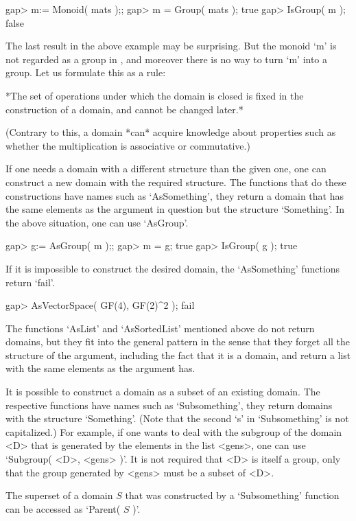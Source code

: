 \beginexample
gap> m:= Monoid( mats );;
gap> m = Group( mats );
true
gap> IsGroup( m );
false
\endexample

The last result in the above example may be surprising.
But the monoid `m' is not regarded as a group in {\GAP},
and moreover there is no way to turn `m' into a group.
Let us formulate this as a rule:

*The set of operations under which the domain is closed is fixed
in the construction of a domain, and cannot be changed later.*

(Contrary to this, a domain *can* acquire knowledge about properties
such as whether the multiplication is associative or commutative.)

If one needs a domain with a different structure than the given one,
one can construct a new domain with the required structure.
The functions that do these constructions have names such as
`AsSomething', they return a domain that has the same elements as the
argument in question but the structure `Something'.
In the above situation, one can use `AsGroup'.

\beginexample
gap> g:= AsGroup( m );;
gap> m = g;
true
gap> IsGroup( g );
true
\endexample

If it is impossible to construct the desired domain, the `AsSomething'
functions return `fail'.

\beginexample
gap> AsVectorSpace( GF(4), GF(2)^2 );
fail
\endexample

The functions `AsList' and `AsSortedList' mentioned above do not return
domains, but they fit into the general pattern in the sense that they
forget all the structure of the argument, including the fact that it is
a domain, and return a list with the same elements as the argument has.



It is possible to construct a domain as a subset of an existing domain.
The respective functions have names such as `Subsomething',
they return domains with the structure `Something'.
(Note that the second `s' in `Subsomething' is not capitalized.)
For example, if one wants to deal with the subgroup of the domain <D>
that is generated by the elements in the list <gens>,
one can use `Subgroup( <D>, <gens> )'.
It is not required that <D> is itself a group, only that the group generated
by <gens> must be a subset of <D>.

The superset of a domain $S$ that was constructed by a `Subsomething'
function can be accessed as `Parent( $S$ )'.

